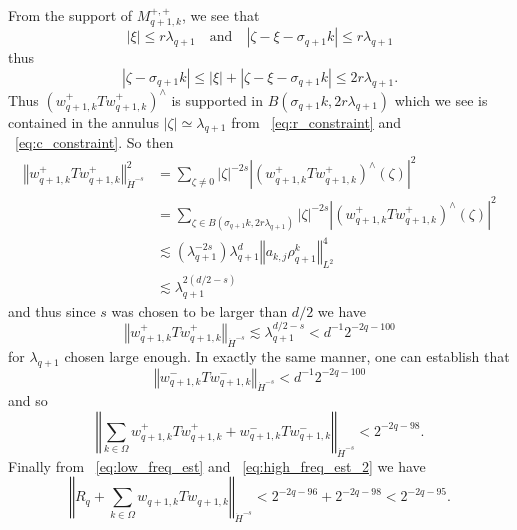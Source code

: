 \documentclass[12pt,reqno,letterpaper]{amsart}
\numberwithin{equation}{section}
\newcommand{\1}{{\bf 1}}
\newcommand{\2}{{\bf 2}}
\theoremstyle{remark}
\theoremstyle{remark}
\begin{document}
From the support of $M_{q+1,k}^{+,+}$, we see that
$$
|\xi| \leq r\lambda_{q+1} \quad \text{and} \quad |\zeta - \xi - \sigma_{q+1}k| \leq r\lambda_{q+1}
$$
thus
\begin{equation*}
    |\zeta - \sigma_{q+1}k| \leq |\xi| + |\zeta - \xi - \sigma_{q+1}k| \leq 2r\lambda_{q+1}.
\end{equation*}
Thus $\left(w_{q+1,k}^+Tw_{q+1,k}^+\right)^\wedge$ is supported in $B(\sigma_{q+1}k,2r\lambda_{q+1})$ which we see is contained in the annulus $|\zeta| \simeq \lambda_{q+1}$ from ~\eqref{eq:r_constraint} and ~\eqref{eq:c_constraint}. So then
\begin{equation*}
    \begin{split}
        \left\Vert w_{q+1,k}^+Tw_{q+1,k}^+ \right\Vert_{\dot{H}^{-s}}^2 &= \sum_{\zeta \not =0} |\zeta|^{-2s} \left|\left(w_{q+1,k}^+Tw_{q+1,k}^+\right)^\wedge(\zeta)\right|^2\\
        &= \sum_{\zeta \in B(\sigma_{q+1}k,2r\lambda_{q+1})} |\zeta|^{-2s} \left|\left(w_{q+1,k}^+Tw_{q+1,k}^+\right)^\wedge(\zeta)\right|^2\\
        &\lesssim \left(\lambda_{q+1}^{-2s}\right) \lambda_{q+1}^d \left\Vert a_{k,j} \rho_{q+1}^k \right\Vert_{L^2}^4\\
        &\lesssim \lambda_{q+1}^{2(d/2-s)}
    \end{split}
\end{equation*}
and thus since $s$ was chosen to be larger than $d/2$ we have
\begin{equation}\label{eq:high_freq_est_1}
    \left\Vert w_{q+1,k}^+Tw_{q+1,k}^+ \right\Vert_{\dot{H}^{-s}} \lesssim \lambda_{q+1}^{d/2-s} < d^{-1}2^{-2q-100}
\end{equation}
for $\lambda_{q+1}$ chosen large enough. In exactly the same manner, one can establish that
\begin{equation*}
    \left\Vert w_{q+1,k}^-Tw_{q+1,k}^- \right\Vert_{\dot{H}^{-s}} < d^{-1}2^{-2q-100}
\end{equation*}
and so
\begin{equation}\label{eq:high_freq_est_2}
    \left\Vert \sum_{k \in \Omega} w_{q+1,k}^+Tw_{q+1,k}^+ + w_{q+1,k}^-Tw_{q+1,k}^- \right\Vert_{\dot{H}^{-s}} < 2^{-2q-98}.
\end{equation}
Finally from ~\eqref{eq:low_freq_est} and ~\eqref{eq:high_freq_est_2} we have
\begin{equation}\label{eq:low_freq_est_final}
    \left\Vert R_q + \sum_{k \in \Omega} w_{q+1,k}Tw_{q+1,k}\right\Vert_{\dot{H}^{-s}} < 2^{-2q-96} + 2^{-2q-98} < 2^{-2q-95}.
\end{equation}
\end{document}
